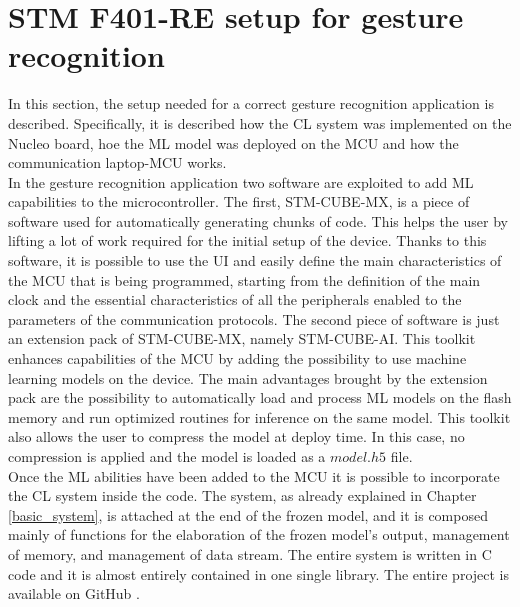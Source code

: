 \documentclass[12pt]{report}
\begin{document}
\section{STM F401-RE setup for gesture recognition}
\label{nucleo_application}
In this section, the setup needed for a correct gesture recognition application is described. Specifically, it is described how the CL system was implemented on the Nucleo board, hoe the ML model was deployed on the MCU and how the communication laptop-MCU works.\\
In the gesture recognition application two software are exploited to add ML capabilities to the microcontroller. The first, STM-CUBE-MX, is a piece of software used for automatically generating chunks of code. This helps the user by lifting a lot of work required for the initial setup of the device. Thanks to this software, it is possible to use the UI and easily define the main characteristics of the MCU that is being programmed, starting from the definition of the main clock and the essential characteristics of all the peripherals enabled to the parameters of the communication protocols. The second piece of software is just an extension pack of STM-CUBE-MX, namely STM-CUBE-AI. This toolkit enhances capabilities of the MCU by adding the possibility to use machine learning models on the device. The main advantages brought by the extension pack are the possibility to automatically load and process ML models on the flash memory and run optimized routines for inference on the same model. This toolkit also allows the user to compress the model at deploy time. In this case, no compression is applied and the model is loaded as a $model.h5$ file.\\
Once the ML abilities have been added to the MCU it is possible to incorporate the CL system inside the code. The system, as already explained in Chapter \ref{basic_system}, is attached at the end of the frozen model, and it is composed mainly of functions for the elaboration of the frozen model's output, management of memory, and management of data stream. The entire system is written in C code and it is almost entirely contained in one single library. The entire project is available on GitHub \cite{github_repo}.\\
\end{document}
